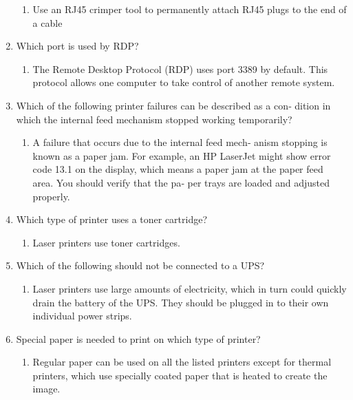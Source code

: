 \documentclass{article}
\begin{document}
\begin{enumerate}
    \begin{enumerate}
        \item 	Use	an	RJ45	crimper	tool	to	permanently	attach
RJ45	plugs	to	the	end	of	a	cable

    \end{enumerate}
    \item Which	port	is	used	by	RDP?
    \begin{enumerate}
        \item The	Remote	Desktop	Protocol	(RDP)	uses	port
3389	by	default.	This	protocol	allows	one	computer	to	take control	of	another	remote	system.

    \end{enumerate}
    \item Which	of	the	following	printer	failures	can	be	described	as	a	con‐
dition	in	which	the	internal	feed	mechanism	stopped	working
temporarily?

    \begin{enumerate}
        \item A	failure	that	occurs	due	to	the	internal	feed	mech‐
anism	stopping	is	known	as	a	paper	jam.	For	example,	an	HP
LaserJet	might	show	error	code	13.1	on	the	display,	which	means
a	paper	jam	at	the	paper	feed	area.	You	should	verify	that	the	pa‐
per	trays	are	loaded	and	adjusted	properly.

    \end{enumerate}
    \item Which	type	of	printer	uses	a	toner	cartridge?

    \begin{enumerate}
        \item Laser	printers	use	toner	cartridges.

    \end{enumerate}
    \item Which	of	the	following	should	not	be	connected	to	a	UPS?

    \begin{enumerate}
        \item Laser	printers	use	large	amounts	of	electricity,
which	in	turn	could	quickly	drain	the	battery	of	the	UPS.	They
should	be	plugged	in	to	their	own	individual	power	strips.

    \end{enumerate}
    \item Special	paper	is	needed	to	print	on	which	type	of	printer?

    \begin{enumerate}
        \item 	Regular	paper	can	be	used	on	all	the	listed	printers
except	for	thermal	printers,	which	use	specially	coated	paper	that
is	heated	to	create	the	image.


\end{enumerate}
\end{enumerate}
\end{document}
